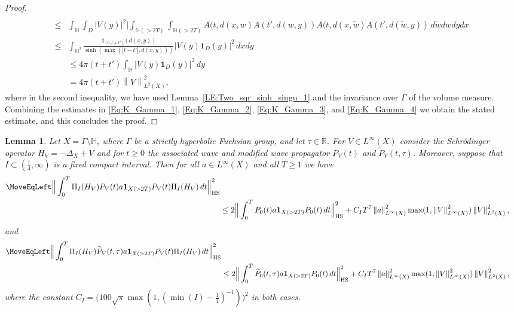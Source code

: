 \documentclass[11pt,twoside,reqno]{amsart}
\newcommand{\R}{\mathbb{R}}
\newcommand{\bH}{\mathbb{H}}
\newcommand{\1}{\mathrm{\mathbf{1}}}
\newcommand{\bHS}{\mathrm{HS}}
\newcommand{\norm}[1]{\left\lVert#1\right\rVert}
\numberwithin{equation}{section}
\theoremstyle{plain}
\newtheorem{lemma}[thm]{Lemma}
\theoremstyle{definition}
\theoremstyle{remark}
\begin{document}
\begin{proof}
\begin{equation}
\begin{aligned}
    \\
    \leq{}& \int_{\mathbb{H}} \int_D |V(y) |^2 \big| \int_{\mathbb{H}( > 2T)} \int_{\mathbb{H}( > 2T)}  A(t, d(x, w) A(t', d( w, y )) A(t, d(x, \tilde{w}) A(t', d( \tilde{w}, y )) \, d \tilde{w} d w  d yd x
    \\
    \leq{}& \int_{\bH^2}   \frac{ \boldsymbol{1}_{[0,t+t']}(d(x,y))}{\sinh (\max(|t-t'|,d(x, y)))}   |V(y)\boldsymbol{1}_D(y)|^2  \, dx dy
    \\
    &\leq 4\pi (t+t') \int_{\bH} |V(y)\boldsymbol{1}_D(y)|^2 \,dy
    \\
    &= 4\pi (t+t') \norm{V}_{L^2(X)}^2, 
    \end{aligned}
\end{equation}
where in the second inequality, we have used Lemma~\ref{LE:Two_sqr_sinh_singu_1} and the invariance over $\Gamma$ of the volume measure. Combining the estimates in \eqref{Eq:K_Gamma_1}, \eqref{Eq:K_Gamma_2}, \eqref{Eq:K_Gamma_3}, and \eqref{Eq:K_Gamma_4} we obtain the stated estimate, and this concludes the proof.
\end{proof}

\begin{lemma}\label{LE:Potential_restriction_2}
Let $X=\Gamma\setminus \bH$, where $\Gamma$ be a strictly hyperbolic Fuchsian group, and let $\tau\in\R$. For $V\in L^\infty(X)$ consider the Schr\"odinger operator $H_V = -\Delta_X + V$ and for $t\geq 0$ the associated wave and modified wave propagator $P_V(t)$ and $\widetilde{P}_V(t,\tau)$. Moreover, suppose that $I\subset (\frac{1}{4},\infty)$ is a fixed compact interval. Then for all $a\in L^\infty(X)$ and all $T\geq1$ we have
\begin{equation*}
    \begin{aligned}
        \MoveEqLeft \Big\lVert \int_0^T \Pi_I(H_V) P_V(t) a \boldsymbol{1}_{X(>2T)} P_V(t) \Pi_I(H_V) \, d t \Big\rVert_{\bHS}^2 
       \\
       &\leq 2\Big\lVert \int_0^T P_0(t) a \boldsymbol{1}_{X(>2T)} P_0(t)   \, d t \Big\rVert_{\bHS}^2 +  C_I T^{7} \norm{a}_{L^\infty(X)}^2 \max(1,\norm{V}_{L^\infty(X)}^2) \norm{V}_{L^2(X)}^2, 
    \end{aligned}
\end{equation*}
and
\begin{equation*}
    \begin{aligned}
        \MoveEqLeft \Big\lVert \int_0^T \Pi_I(H_V) \widetilde{P}_V(t,\tau) a \boldsymbol{1}_{X(>2T)} P_V(t) \Pi_I(H_V) \, d t \Big\rVert_{\bHS}^2 
       \\
       &\leq 2\Big\lVert \int_0^T \widetilde{P}_0(t,\tau) a \boldsymbol{1}_{X(>2T)} P_0(t)   \, d t \Big\rVert_{\bHS}^2 +  C_I T^{7} \norm{a}_{L^\infty(X)}^2 \max(1,\norm{V}_{L^\infty(X)}^2) \norm{V}_{L^2(X)}^2, 
    \end{aligned}
\end{equation*}
where the constant $C_I=\big(100 \sqrt{\pi }\max(1,(\min(I)-\frac14)^{-1})\big)^2$ in both cases.
\end{lemma}
\end{document}

